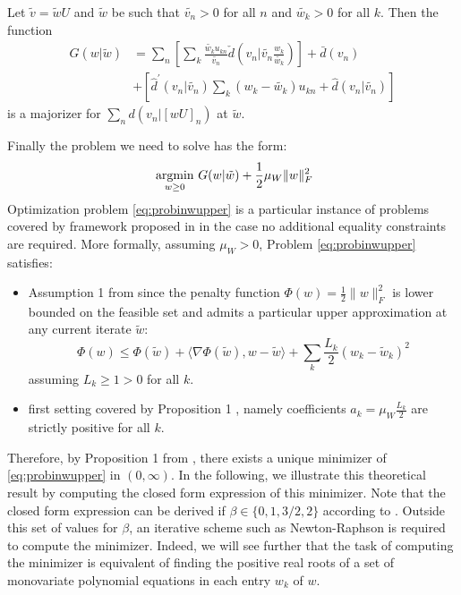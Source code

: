 \documentclass[a4paper, 11pt]{article}
\begin{document}
\begin{lemma} \label{defG}
Let $\tilde{v} = \tilde{w}U$ and $\tilde{w}$ be such that $\tilde{v_{n}} >0$ for all $n$ and $\tilde{w_{k}} >0$ for all $k$.  
Then the function 
\begin{equation}\label{eq:20}
\begin{aligned}
G(w|\tilde{w})&=\sum_{n}\left[\sum_{k} \frac{\tilde{w_{k}}u_{kn}}{\tilde{v_{n}}}\check{d}(v_{n}|\tilde{v_{n}}\frac{w_{k}}{\tilde{w_{k}}})\right] +\bar{d}(v_{n})  \\
&+\left[\hat{d}^{'}(v_{n}|\tilde{v_{n}})\sum_{k}(w_{k}-\tilde{w_{k}})u_{kn}+\hat{d}(v_{n}|\tilde{v_{n}}) \right]
\end{aligned}
\end{equation} 
is a majorizer for $\sum_{n}d(v_{n}|\left[wU\right]_{n})$ at $\tilde{w}$.
\end{lemma}
Finally the problem we need to solve has the form:
\begin{equation}\label{eq:probinwupper}
  \underset{w \geq 0}{\mathop{\text{~argmin~}}}G(w|\tilde{w}) + \frac{1}{2} \mu_W \|w\|_F^2
\end{equation}
Optimization problem \eqref{eq:probinwupper} is a particular instance of problems covered by framework proposed in \cite{doi:10.1137/20M1377278} in the case no additional equality constraints are required. More formally, assuming $\mu_W > 0$,  Problem \eqref{eq:probinwupper} satisfies:
\begin{itemize}
    \item Assumption 1 from \cite{doi:10.1137/20M1377278} since the penalty function $\Phi(w)=\frac{1}{2}\|w\|_F^2$ is lower bounded on the feasible set and admits a particular upper approximation at any current iterate $\widetilde{w}$:
    \begin{equation}
        \Phi(w) \leq \Phi(\widetilde{w}) + \langle \nabla\Phi(\widetilde{w}),w-\widetilde{w} \rangle + \sum_k \frac{L_k}{2}(w_k-\widetilde{w}_k)^2
    \end{equation}
    assuming $L_k \geq 1 > 0$ for all $k$.
    \item first setting covered by Proposition 1 \cite{doi:10.1137/20M1377278}, namely coefficients $a_k=\mu_W \frac{L_k}{2}$ are strictly positive for all $k$.
\end{itemize}

Therefore, by Proposition 1 from \cite{doi:10.1137/20M1377278}, there exists a unique minimizer of \eqref{eq:probinwupper} in $(0,\infty)$. In the following, we illustrate this theoretical result by computing the closed form expression of this minimizer. Note that the closed form expression can be derived if $\beta \in \{0,1,3/2,2\}$ according to \cite{doi:10.1137/20M1377278}.  Outside this set of values for $\beta$, an iterative scheme such as Newton-Raphson is required to compute the minimizer. Indeed, we will see further that the task of computing the minimizer is equivalent of finding the positive real roots of a set of monovariate polynomial equations in each entry $w_k$ of $w$.
\end{document}
